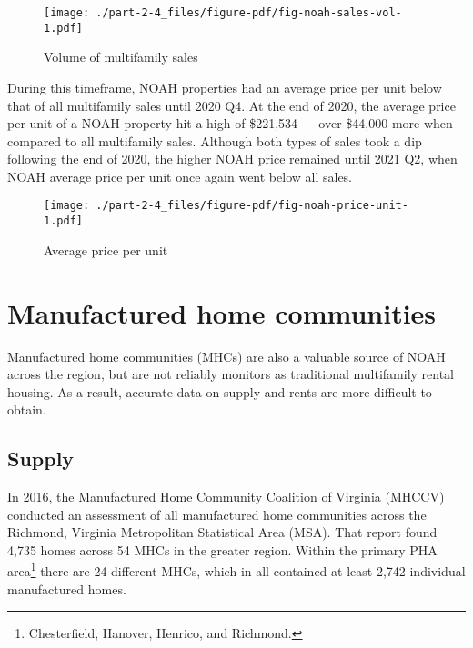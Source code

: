 \documentclass[
  letterpaper,
  DIV=11,
  numbers=noendperiod]{scrreprt}
\begin{document}
\begin{figure}

{\centering \texttt{[image: ./part-2-4\_files/figure-pdf/fig-noah-sales-vol-1.pdf]}

}

\caption{\label{fig-noah-sales-vol}Volume of multifamily sales}

\end{figure}

During this timeframe, NOAH properties had an average price per unit
below that of all multifamily sales until 2020 Q4. At the end of 2020,
the average price per unit of a NOAH property hit a high of \$221,534
--- over \$44,000 more when compared to all multifamily sales. Although
both types of sales took a dip following the end of 2020, the higher
NOAH price remained until 2021 Q2, when NOAH average price per unit once
again went below all sales.

\begin{figure}

{\centering \texttt{[image: ./part-2-4\_files/figure-pdf/fig-noah-price-unit-1.pdf]}

}

\caption{\label{fig-noah-price-unit}Average price per unit}

\end{figure}

\hypertarget{manufactured-home-communities}{%
\section{Manufactured home
communities}\label{manufactured-home-communities}}

Manufactured home communities (MHCs) are also a valuable source of NOAH
across the region, but are not reliably monitors as traditional
multifamily rental housing. As a result, accurate data on supply and
rents are more difficult to obtain.

\hypertarget{supply-3}{%
\subsection{Supply}\label{supply-3}}

In 2016, the Manufactured Home Community Coalition of Virginia (MHCCV)
conducted an assessment of all manufactured home communities across the
Richmond, Virginia Metropolitan Statistical Area (MSA). That report
found 4,735 homes across 54 MHCs in the greater region. Within the
primary PHA area\footnote{Chesterfield, Hanover, Henrico, and Richmond.}
there are 24 different MHCs, which in all contained at least 2,742
individual manufactured homes.
\end{document}
